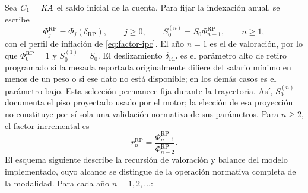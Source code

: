 Sea $C_1=\mathit{KA}$ el saldo inicial de la cuenta. Para fijar la indexación anual,
se escribe
\[
 \Phi_j^{\mathrm{RP}}=\Phi_j(\delta_{\mathrm{RP}}),\qquad j\ge0,
 \qquad S_0^{(n)}=S_0\Phi_{n-1}^{\mathrm{RP}},\qquad n\ge1,
\]
con el perfil de inflación de \cref{eq:factor-ipc}. El año $n=1$ es el de
valoración, por lo que $\Phi_0^{\mathrm{RP}}=1$ y $S_0^{(1)}=S_0$.
El deslizamiento $\delta_{\mathrm{RP}}$ es el parámetro alto de retiro
programado si la mesada reportada originalmente difiere del salario mínimo
en menos de un peso o si ese dato no está disponible; en los demás casos
es el parámetro bajo. Esta selección permanece fija durante la trayectoria.
Así, $S_0^{(n)}$ documenta el piso proyectado usado por el motor; la elección
de esa proyección no constituye por sí sola una validación normativa de sus
parámetros. Para $n\ge2$, el factor incremental es
\[
 r_n^{\mathrm{RP}}=
 \frac{\Phi_{n-1}^{\mathrm{RP}}}{\Phi_{n-2}^{\mathrm{RP}}}.
\]
El esquema siguiente describe
la recursión de valoración y balance del modelo implementado, cuyo alcance
se distingue de la operación normativa completa de la modalidad. Para cada
año $n=1,2,\dots$:


